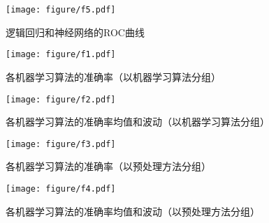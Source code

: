 \documentclass[a4paper]{ctexart}
\begin{document}
\begin{figure}[htbp]
	\centering
	\texttt{[image: figure/f5.pdf]}
	\caption{逻辑回归和神经网络的ROC曲线}
	\label{figure:ROC曲线}
\end{figure}
\begin{figure}[htbp]
	\centering
	\texttt{[image: figure/f1.pdf]}
	\caption{各机器学习算法的准确率（以机器学习算法分组）}
	\label{figure:总体正确率}
\end{figure}
\begin{figure}[htbp]
	\centering
	\texttt{[image: figure/f2.pdf]}
	\caption{各机器学习算法的准确率均值和波动（以机器学习算法分组）}
	\label{figure:网络总体正确率}
\end{figure}
\begin{figure}[htbp]
	\centering
	\texttt{[image: figure/f3.pdf]}
	\caption{各机器学习算法的准确率（以预处理方法分组）}
	\label{figure:数据集正确率}
\end{figure}
\begin{figure}[htbp]
	\centering
	\texttt{[image: figure/f4.pdf]}
	\caption{各机器学习算法的准确率均值和波动（以预处理方法分组）}
	\label{figure:网络数据集正确率}
\end{figure}

\newpage
\end{document}
